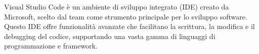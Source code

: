 Visual Studio Code è un ambiente di sviluppo integrato (IDE) creato da Microsoft, scelto dal team come strumento principale per lo sviluppo software. Questo IDE offre funzionalità avanzate che facilitano la scrittura, la modifica e il debugging del codice, supportando una vasta gamma di linguaggi di programmazione e framework.

